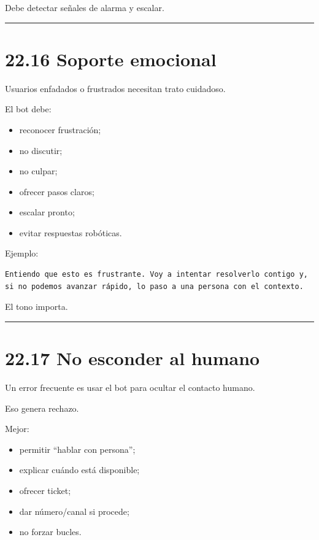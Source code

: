 Debe detectar señales de alarma y escalar.

\begin{center}\rule{0.5\linewidth}{0.5pt}\end{center}

\section{22.16 Soporte emocional}\label{soporte-emocional}

Usuarios enfadados o frustrados necesitan trato cuidadoso.

El bot debe:

\begin{itemize}
\tightlist
\item
  reconocer frustración;
\item
  no discutir;
\item
  no culpar;
\item
  ofrecer pasos claros;
\item
  escalar pronto;
\item
  evitar respuestas robóticas.
\end{itemize}

Ejemplo:

\begin{lstlisting}
Entiendo que esto es frustrante. Voy a intentar resolverlo contigo y, si no podemos avanzar rápido, lo paso a una persona con el contexto.
\end{lstlisting}

El tono importa.

\begin{center}\rule{0.5\linewidth}{0.5pt}\end{center}

\section{22.17 No esconder al humano}\label{no-esconder-al-humano}

Un error frecuente es usar el bot para ocultar el contacto humano.

Eso genera rechazo.

Mejor:

\begin{itemize}
\tightlist
\item
  permitir ``hablar con persona'';
\item
  explicar cuándo está disponible;
\item
  ofrecer ticket;
\item
  dar número/canal si procede;
\item
  no forzar bucles.
\end{itemize}


